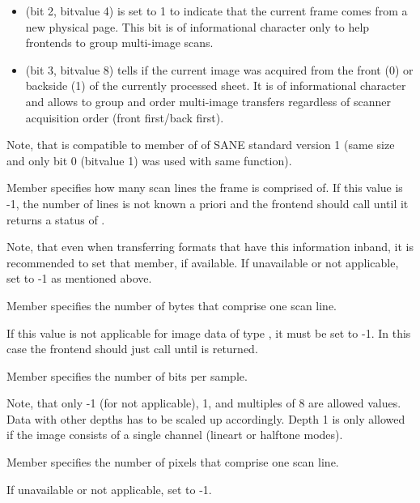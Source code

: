 \documentclass[11pt,DVIps]{report}
\begin{document}
\begin{changebar}
\begin{itemize}
\item
{} (bit 2, bitvalue 4) is set to 1 to indicate 
that the current frame comes from a new physical page. This bit is of 
informational character only to help frontends to group multi-image 
scans. 

\item
{} (bit 3, bitvalue 8) tells if the current image 
was acquired from the front (0) or backside (1) of the currently processed 
sheet. It is of informational character and allows to group and order 
multi-image transfers regardless of scanner acquisition order (front 
first/back first). 

\end{itemize}

Note, that  is compatible to member  of 
 of SANE standard version 1 (same size
and only bit 0 (bitvalue 1) was used with same function).
\end{changebar}

Member  specifies how many scan lines the frame is
comprised of.  If this value is -1, the number of lines is not known a
priori and the frontend should call  until it
returns a status of .
\begin{changebar}
Note, that even when transferring formats that have this information 
inband, it is recommended to set that member, if available. If 
unavailable or not applicable, set to -1 as mentioned above. 
\end{changebar}

Member  specifies the number of bytes that comprise one
scan line.
\begin{changebar}
If this value is not applicable for image data of type
, it must be set to -1. In this case the frontend
should just call  until  is returned.
\end{changebar}

Member  specifies the number of bits per sample.
\begin{changebar}
Note, that only -1 (for not applicable), 1, and multiples of 8 are
allowed values. Data with other depths has to be scaled up accordingly.
Depth 1 is only allowed if the image consists of a single channel (lineart or
halftone modes).
\end{changebar}

Member  specifies the number of pixels that
comprise one scan line.
\begin{changebar}
If unavailable or not applicable, set to -1.
\end{changebar}
\end{document}
